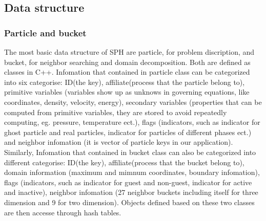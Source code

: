 \documentclass[10pt,a4paper]{article}
\begin{document}
\subsection{Data structure}
\subsubsection{Particle and bucket}
The most basic data structure of SPH are particle, for problem discription, and bucket, for neighbor searching and domain decomposition. Both are defined as classes in C++. Infomation that contained in particle class can be categorized into six categorise: ID(the key), affiliate(process that the particle belong to), primitive variables (variables show up as unknows in governing equations, like coordinates, density, velocity, energy), secondary variables (properties that can be computed from primitive variables, they are stored to avoid repeatedly computing, eg. pressure, temperature ect.), flags (indicators, such as indicator for ghost particle and real particles, indicator for particles of different phases ect.) and neighbor infomation (it is vector of particle keys in our application). Similarly,  Infomation that contained in bucket class can also be categorized into different categorise: ID(the key), affiliate(process that the bucket belong to), domain information (maximum and mimnum coordinates, boundary infomation), flags (indicators, such as indicator for guest and non-guest, indicator for active and inactive), neighbor infomation (27 neighbor buckets including itself for three dimension and 9 for two dimension). Objects defined based on these two classes are then accesse through hash tables.
\end{document}
